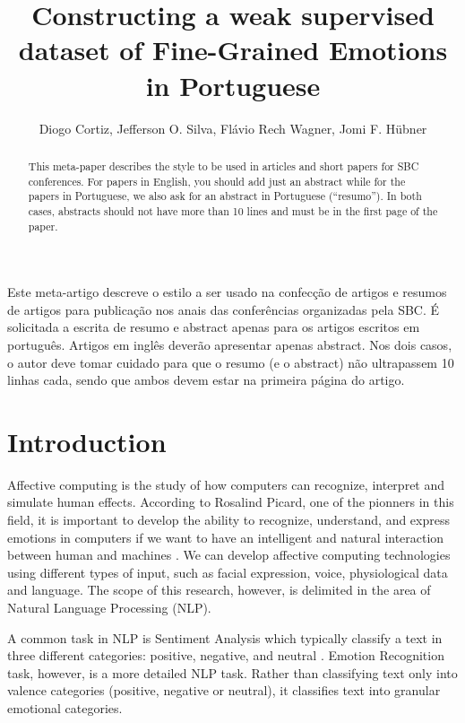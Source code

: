 \documentclass[12pt]{article}
\title{Constructing a weak supervised dataset of Fine-Grained Emotions in Portuguese}
\author{Diogo Cortiz\inst{1,2}, Jefferson O. Silva\inst{2}, Flávio Rech
  Wagner\inst{2}, Jomi F. Hübner\inst{3} }
\begin{document}
\maketitle

\begin{abstract}
  This meta-paper describes the style to be used in articles and short papers
  for SBC conferences. For papers in English, you should add just an abstract
  while for the papers in Portuguese, we also ask for an abstract in
  Portuguese (``resumo''). In both cases, abstracts should not have more than
  10 lines and must be in the first page of the paper.
\end{abstract}

\begin{resumo}
  Este meta-artigo descreve o estilo a ser usado na confecção de artigos e
  resumos de artigos para publicação nos anais das conferências organizadas
  pela SBC. É solicitada a escrita de resumo e abstract apenas para os artigos
  escritos em português. Artigos em inglês deverão apresentar apenas abstract.
  Nos dois casos, o autor deve tomar cuidado para que o resumo (e o abstract)
  não ultrapassem 10 linhas cada, sendo que ambos devem estar na primeira
  página do artigo.
\end{resumo}


\section{Introduction}

Affective computing is the study of how computers can recognize, interpret and simulate human effects. According to Rosalind Picard, one of the pionners in this field, it is important to develop the ability to recognize, understand, and express emotions in computers if we want to have an intelligent and natural interaction between human and machines \cite{Rosalind2000}. We can develop affective computing technologies using different types of input, such as facial expression, voice, physiological data and language. The scope of this research, however, is delimited in the area of Natural Language Processing (NLP).

A common task in NLP is Sentiment Analysis which typically classify a text in three different categories: positive, negative, and neutral \cite{Drus2019}. Emotion Recognition task, however, is a more detailed NLP task. Rather than classifying text only into valence categories (positive, negative or neutral), it classifies text into granular emotional categories.
\end{document}
